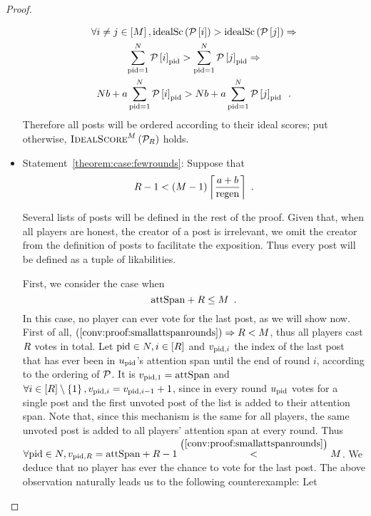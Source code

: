 \documentclass[a4paper,english,cleveref, autoref]{oasics-v2019}
\begin{document}
\begin{subappendices}
\begin{proof}
\begin{itemize}
    \begin{gather*}
      \forall i \neq j \in \left[M\right], \mathrm{idealSc}\left(\mathcal{P}\left[i\right]\right)
      > \mathrm{idealSc}\left(\mathcal{P}\left[j\right]\right) \Rightarrow \\
      \sum\limits_{\mathrm{pid} = 1}^N \mathcal{P}\left[i\right]_{\mathrm{pid}} >
      \sum\limits_{\mathrm{pid} = 1}^N \mathcal{P}\left[j\right]_{\mathrm{pid}} \Rightarrow
      \\
      N b + a \sum\limits_{\mathrm{pid} = 1}^N
      \mathcal{P}\left[i\right]_{\mathrm{pid}} > N b + a \sum\limits_{\mathrm{pid} =
      1}^N \mathcal{P}\left[j\right]_{\mathrm{pid}} \enspace.
    \end{gather*}
    Therefore all posts will be ordered according to their ideal scores; put
    otherwise, $\textsc{IdealScore}^M\left(\mathcal{P}_R\right)$ holds.

    \item Statement~\ref{theorem:case:fewrounds}: Suppose that
    \begin{equation}
      \label{conv:proof:fewrounds}
      \rounds - 1 < \left(\postlen - 1\right)\ceil*{\frac{a+b}{\regen}}
      \enspace.
    \end{equation}

    Several lists of posts will be defined in the rest of the proof. Given that,
    when all players are honest, the creator of a post is irrelevant, we omit
    the creator from the definition of posts to facilitate the exposition. Thus
    every post will be defined as a tuple of likabilities.

    First, we consider the case when
    \begin{equation}
      \label{conv:proof:smallattspanrounds}
      \mathrm{attSpan} + R \leq M \enspace.
    \end{equation}
    In this case, no player can ever vote for the last post, as we will show
    now. First of all, $(\ref{conv:proof:smallattspanrounds}) \Rightarrow
    R < M$, thus all players cast $R$ votes in total. Let
    $\mathrm{pid} \in N, i \in \left[R\right]$ and $v_{\mathrm{pid}, i}$ the
    index of the last post that has ever been in $u_{\mathrm{pid}}$'s attention span
    until the end of round $i$, according to the ordering of $\mathcal{P}$. It is
    $v_{\mathrm{pid}, 1} = \mathrm{attSpan}$ and $\forall i \in \left[R\right] \setminus
    \left\{1\right\}, v_{\mathrm{pid}, i} = v_{\mathrm{pid}, i - 1} + 1$, since in every round
    $u_{\mathrm{pid}}$ votes for a single post and the first unvoted post of the
    list is added to their attention span. Note that, since this mechanism is
    the same for all players, the same unvoted post is added to all players'
    attention span at every round. Thus $\forall \mathrm{pid} \in N, v_{\mathrm{pid},
    R} = \mathrm{attSpan} + R - 1
    \overset{\left(\ref{conv:proof:smallattspanrounds}\right)}{<} M$. We
    deduce that no player has ever the chance to vote for the last post. The
    above observation naturally leads us to the following counterexample: Let


\end{itemize}
\end{proof}
\end{subappendices}
\end{document}
